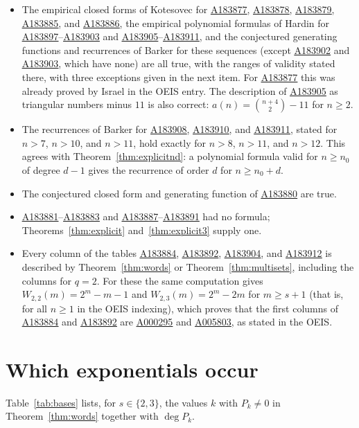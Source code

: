 \documentclass[12pt,reqno]{article}
\newcommand{\seqnum}[1]{\href{https://oeis.org/#1}{\rm \underline{#1}}}
\begin{document}
\begin{itemize}
\item The empirical closed forms of Kotesovec for \seqnum{A183877},
\seqnum{A183878}, \seqnum{A183879}, \seqnum{A183885}, and \seqnum{A183886},
the empirical polynomial formulas of Hardin for \seqnum{A183897}--\seqnum{A183903}
and \seqnum{A183905}--\seqnum{A183911}, and the conjectured generating
functions and recurrences of Barker for these sequences (except
\seqnum{A183902} and \seqnum{A183903}, which have none) are all true, with
the ranges of validity stated there, with three exceptions given in the next
item. For \seqnum{A183877} this was already proved by Israel in the OEIS
entry. The description of \seqnum{A183905} as triangular numbers minus $11$ is
also correct: $a(n) = \binom{n+4}{2} - 11$ for $n \ge 2$.
\item The recurrences of Barker for \seqnum{A183908}, \seqnum{A183910}, and
\seqnum{A183911}, stated for $n > 7$, $n > 10$, and $n > 11$, hold exactly for
$n > 8$, $n > 11$, and $n > 12$. This agrees with
Theorem~\ref{thm:explicitnd}: a polynomial formula valid for $n \ge n_0$ of
degree $d - 1$ gives the recurrence of order $d$ for $n \ge n_0 + d$.
\item The conjectured closed form and generating function of
\seqnum{A183880} are true.
\item \seqnum{A183881}--\seqnum{A183883} and \seqnum{A183887}--\seqnum{A183891}
had no formula; Theorems~\ref{thm:explicit} and~\ref{thm:explicit3} supply
one.
\item Every column of the tables \seqnum{A183884}, \seqnum{A183892},
\seqnum{A183904}, and \seqnum{A183912} is described by
Theorem~\ref{thm:words} or Theorem~\ref{thm:multisets}, including the
columns for $q = 2$. For these the same computation gives
$W_{2,2}(m) = 2^m - m - 1$ and $W_{2,3}(m) = 2^m - 2m$ for $m \ge s+1$ (that is,
for all $n \ge 1$ in the OEIS indexing), which
proves that the first columns of \seqnum{A183884} and \seqnum{A183892} are
\seqnum{A000295} and \seqnum{A005803}, as stated in the OEIS.
\end{itemize}

\section{Which exponentials occur}\label{sec:bases}

Table~\ref{tab:bases} lists, for $s \in \{2, 3\}$, the values $k$ with
$P_k \ne 0$ in Theorem~\ref{thm:words} together with $\deg P_k$.
\end{document}
